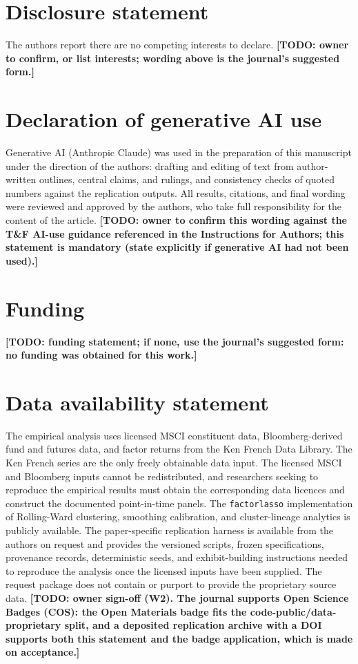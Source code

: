 \documentclass{rQUF2e}
\theoremstyle{plain}
\theoremstyle{remark}
\newcommand{\TODO}[1]{\textbf{[TODO: #1]}}
\begin{document}
\section*{Disclosure statement}
The authors report there are no competing interests to declare.
\TODO{owner to confirm, or list interests; wording above is the journal's
suggested form.}

\section*{Declaration of generative AI use}
Generative AI (Anthropic Claude) was used in the preparation of this
manuscript under the direction of the authors: drafting and editing of text
from author-written outlines, central claims, and rulings, and consistency
checks of quoted numbers against the replication outputs. All results,
citations, and final wording were reviewed and approved by the authors, who
take full responsibility for the content of the article. \TODO{owner to
confirm this wording against the T\&F AI-use guidance referenced in the
Instructions for Authors; this statement is mandatory (state explicitly if
generative AI had not been used).}

\section*{Funding}
\TODO{funding statement; if none, use the journal's suggested form: no
funding was obtained for this work.}

\section*{Data availability statement}
The empirical analysis uses licensed MSCI constituent data, Bloomberg-derived
fund and futures data, and factor returns from the Ken French Data Library.
The Ken French series are the only freely obtainable data input. The licensed
MSCI and Bloomberg inputs cannot be redistributed, and researchers seeking to
reproduce the empirical results must obtain the corresponding data licences
and construct the documented point-in-time panels. The \texttt{factorlasso}
implementation of Rolling-Ward clustering, smoothing calibration, and
cluster-lineage analytics is publicly available. The paper-specific
replication harness is available from the authors on request and provides the
versioned scripts, frozen specifications, provenance records, deterministic
seeds, and exhibit-building instructions needed to reproduce the analysis
once the licensed inputs have been supplied. The request package does not
contain or purport to provide the proprietary source data.
\TODO{owner sign-off (W2). The journal supports Open Science Badges (COS):
the Open Materials badge fits the code-public/data-proprietary split, and a
deposited replication archive with a DOI supports both this statement and
the badge application, which is made on acceptance.}
\end{document}
